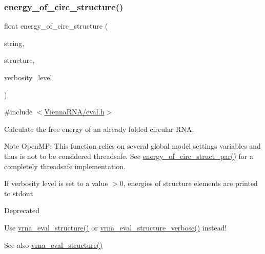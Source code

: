 \subsubsection{\texorpdfstring{energy\+\_\+of\+\_\+circ\+\_\+structure()}{energy\_of\_circ\_structure()}}
{\footnotesize\ttfamily float energy\+\_\+of\+\_\+circ\+\_\+structure (\begin{DoxyParamCaption}\item[{const char $\ast$}]{string,  }\item[{const char $\ast$}]{structure,  }\item[{int}]{verbosity\+\_\+level }\end{DoxyParamCaption})}



{\ttfamily \#include $<$\mbox{\hyperlink{eval_8h}{Vienna\+R\+N\+A/eval.\+h}}$>$}



Calculate the free energy of an already folded circular R\+NA. 

\begin{DoxyNote}{Note}
Open\+MP\+: This function relies on several global model settings variables and thus is not to be considered threadsafe. See \mbox{\hyperlink{group__eval_ga3f01f9744ba6a40555eb4d81fc77f6df}{energy\+\_\+of\+\_\+circ\+\_\+struct\+\_\+par()}} for a completely threadsafe implementation.
\end{DoxyNote}
If verbosity level is set to a value $>$0, energies of structure elements are printed to stdout

\begin{DoxyRefDesc}{Deprecated}
\item[\mbox{\hyperlink{deprecated__deprecated000054}{Deprecated}}]Use \mbox{\hyperlink{group__eval_ga58f199f1438d794a265f3b27fc8ea631}{vrna\+\_\+eval\+\_\+structure()}} or \mbox{\hyperlink{group__eval_ga0928d699d310178f84ee2351034e5cb5}{vrna\+\_\+eval\+\_\+structure\+\_\+verbose()}} instead!\end{DoxyRefDesc}


\begin{DoxySeeAlso}{See also}
\mbox{\hyperlink{group__eval_ga58f199f1438d794a265f3b27fc8ea631}{vrna\+\_\+eval\+\_\+structure()}}
\end{DoxySeeAlso}

